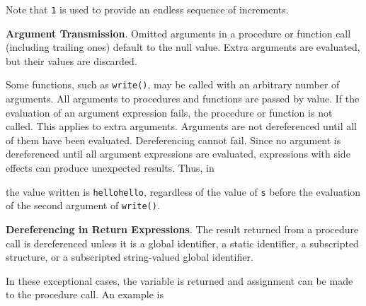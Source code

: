

Note that \texttt{{\textbar}1} is used to provide an endless sequence
of increments.


\textbf{Argument Transmission}. Omitted arguments in a procedure or
function call (including trailing ones) default to the null
value. Extra arguments are evaluated, but their values are discarded.

Some functions, such as \texttt{write()}, may be called with an
arbitrary number of arguments. All arguments to procedures and
functions are passed by value. If the evaluation of an argument
expression fails, the procedure or function is not called. This
applies to extra arguments. Arguments are not dereferenced until all
of them have been evaluated. Dereferencing cannot fail. Since no
argument is dereferenced until all argument expressions are evaluated,
expressions with side effects can produce unexpected results. Thus, in



\noindent the value written is \texttt{hellohello}, regardless of the
value of \texttt{s} before the evaluation of the second argument of
\texttt{write()}.


\textbf{Dereferencing in Return Expressions}. The result returned from
a procedure call is dereferenced unless it is a global identifier, a
static identifier, a subscripted structure, or a subscripted
string-valued global identifier.

In these exceptional cases, the variable is returned and assignment
can be made to the procedure call. An example is



